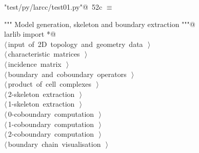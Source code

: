 \documentclass[11pt,oneside]{article}	%
\begin{document}
\begin{flushleft} \small \label{scrap86}
\protect{}\verb@"test/py/larcc/test01.py"@\nobreak\ {\footnotesize 52c }$\equiv$
\vspace{-1ex}
\begin{list}{}{} \item
\mbox{}\verb@""" Model generation, skeleton and boundary extraction """@\\
\mbox{}\verb@from larlib import *@\\
\mbox{}\verb@@\hbox{$\langle\,$input of 2D topology and geometry data\nobreak\ {\footnotesize {}}$\,\rangle$}\verb@@\\
\mbox{}\verb@@\hbox{$\langle\,$characteristic matrices\nobreak\ {\footnotesize {}}$\,\rangle$}\verb@@\\
\mbox{}\verb@@\hbox{$\langle\,$incidence matrix\nobreak\ {\footnotesize {}}$\,\rangle$}\verb@@\\
\mbox{}\verb@@\hbox{$\langle\,$boundary and coboundary operators\nobreak\ {\footnotesize {}}$\,\rangle$}\verb@@\\
\mbox{}\verb@@\hbox{$\langle\,$product of cell complexes\nobreak\ {\footnotesize {}}$\,\rangle$}\verb@@\\
\mbox{}\verb@@\hbox{$\langle\,$2-skeleton extraction\nobreak\ {\footnotesize {}}$\,\rangle$}\verb@@\\
\mbox{}\verb@@\hbox{$\langle\,$1-skeleton extraction\nobreak\ {\footnotesize {}}$\,\rangle$}\verb@@\\
\mbox{}\verb@@\hbox{$\langle\,$0-coboundary computation\nobreak\ {\footnotesize {}}$\,\rangle$}\verb@@\\
\mbox{}\verb@@\hbox{$\langle\,$1-coboundary computation\nobreak\ {\footnotesize {}}$\,\rangle$}\verb@@\\
\mbox{}\verb@@\hbox{$\langle\,$2-coboundary computation\nobreak\ {\footnotesize {}}$\,\rangle$}\verb@@\\
\mbox{}\verb@@\hbox{$\langle\,$boundary chain visualisation\nobreak\ {\footnotesize {}}$\,\rangle$}\verb@@\\
\mbox{}\verb@@{\NWsep}
\end{list}
\vspace{-2ex}
\end{flushleft}
\end{document}
